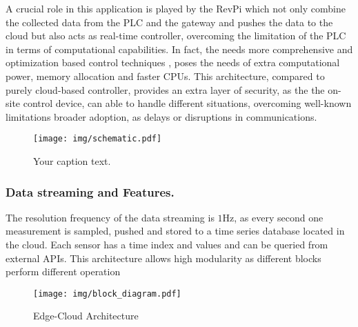 A crucial role in this application is played by the RevPi which not only combine the collected data from the 
PLC and the gateway and pushes the data to the cloud but also acts as real-time controller, overcoming the limitation 
of the PLC in terms of computational capabilities. In fact, the needs more comprehensive and optimization based control techniques 
, poses the needs of extra computational power, memory allocation and faster CPUs.
This architecture, compared to purely cloud-based controller, provides an extra layer of security, as the the on-site control device, can able to handle different 
situations, overcoming well-known limitations broader adoption, as delays or disruptions in communications.


\begin{figure}[h]
    \centering
    \hspace{2cm}
    \texttt{[image: img/schematic.pdf]}
    \caption{Your caption text.}
    \label{fig:your_label}
\end{figure}


\subsubsection{Data streaming and Features.}
The resolution frequency of the data streaming is $1\si{\hertz}$, as every second one measurement is sampled, pushed and stored to a time series database 
located in the cloud. Each sensor has a time index and values and can be queried from external APIs. 
This architecture allows high modularity as different blocks perform different operation



\begin{table}[!t]
    \renewcommand{\arraystretch}{1.3}
    \caption{Sensors Overview}
    \centering
    \label{table_1}
\end{table}


\begin{figure}[H]
    \centering
    \texttt{[image: img/block\_diagram.pdf]}
    \caption{Edge-Cloud Architecture }
    \label{fig:your_label}
\end{figure}